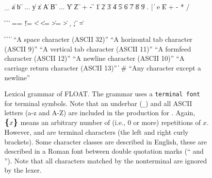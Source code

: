 \documentclass[11pt]{article}
\begin{document}
\begin{figure}
\begin{grammar}
 \:  
 \: \_ \| a \| b \| $\ldots$ \| y \| z \| A \| B \| $\ldots$ \| Y \| Z
 \:  \| 
 \:     
 \: + \| - \| 
  \| 1 \| 2 \| 3 \| 4 \| 5 \| 6 \| 7 \| 8 \| 9
 \: .  | 
 \:     \| 
 \: e \| E
 \: +
 \: -
 \: *
 \: /

 \:  \|  \|  \|  \| 
 \: == \| != \| < \| <= \| >= \| >
 \: , \| ;
 \: \gramquote{\{} \| \gramquote{\}} \| =

 \:  \|  \|  \|  \|  \| 
 \: \textrm{``A space character (ASCII 32)''}
 \: \textrm{``A horizontal tab character (ASCII 9)''}
 \: \textrm{``A vertical tab character (ASCII 11)''}
 \: \textrm{``A formfeed character (ASCII 12)''}
 \: \textrm{``A newline character (ASCII 10)''}
 \: \textrm{``A carriage return character (ASCII 13)''}
 \:  \|  
 \:   
 \: \#
 \: \textrm{``Any character except a newline''}
\end{grammar}
\caption{Lexical grammar of FLOAT. The grammar uses a \texttt{terminal font}
  for terminal symbols. Note that an underbar (\texttt{\_}) and all ASCII letters (a-z and A-Z)
  are included in the production for .
  Again, $\textrm{\textbf{\large{\{}}}x\textrm{\textbf{\large{\}}}}$ means an arbitrary number of (i.e., 0 or more) repetitions of $x$.
  However, \gramquote{\texttt{\{}} and \gramquote{\texttt{\}}} are
  terminal characters (the left and right curly brackets).
  Some character classes are described in English, these are described
  in a Roman font between double quotation marks (`` and '').
  Note that all characters matched by the nonterminal
   are ignored by the lexer.}
\label{fig:lexical-grammar}
\end{figure}
\end{document}
